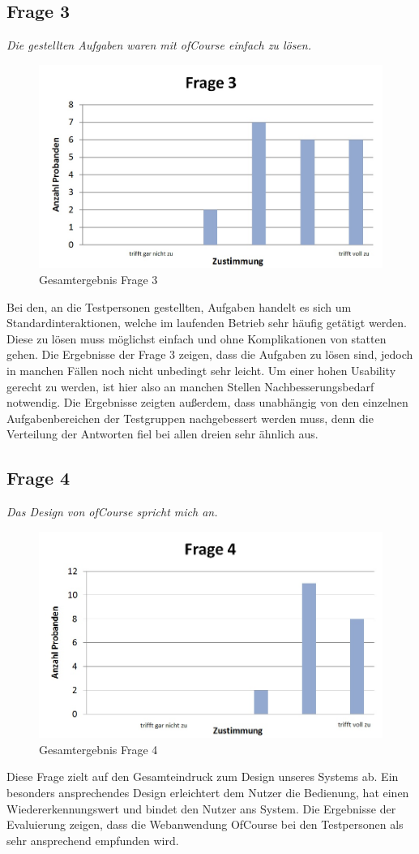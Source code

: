 \subsection{Frage 3}
\begin{center}
	{\it Die gestellten Aufgaben waren mit ofCourse einfach zu lösen.}
\end{center}
\begin{figure}[h]
\centering
\includegraphics[width=0.7\linewidth]{img/Frage3}
\caption{Gesamtergebnis Frage 3}
\label{fig:Frage3}
\end{figure}
Bei den, an die Testpersonen gestellten, Aufgaben handelt es sich um Standardinteraktionen, welche im laufenden Betrieb sehr häufig getätigt werden. Diese zu lösen muss möglichst einfach und ohne Komplikationen von statten gehen. Die Ergebnisse der Frage 3 zeigen, dass die Aufgaben zu lösen sind, jedoch in manchen Fällen noch nicht unbedingt sehr leicht. Um einer hohen Usability gerecht zu werden, ist hier also an manchen Stellen Nachbesserungsbedarf notwendig. Die Ergebnisse zeigten außerdem, dass unabhängig von den einzelnen Aufgabenbereichen der Testgruppen nachgebessert werden muss, denn die Verteilung der Antworten fiel bei allen dreien sehr ähnlich aus.

\subsection{Frage 4}
\begin{center}
	{\it Das Design von ofCourse spricht mich an.}
\end{center}
\begin{figure}[h]
\centering
\includegraphics[width=0.7\linewidth]{img/Frage4}
\caption{Gesamtergebnis Frage 4}
\label{fig:Frage4}
\end{figure}
Diese Frage zielt auf den Gesamteindruck zum Design unseres Systems ab. Ein besonders ansprechendes Design erleichtert dem Nutzer die Bedienung, hat einen Wiedererkennungswert und bindet den Nutzer ans System. Die Ergebnisse der Evaluierung zeigen, dass die Webanwendung OfCourse bei den Testpersonen als sehr ansprechend empfunden wird.

